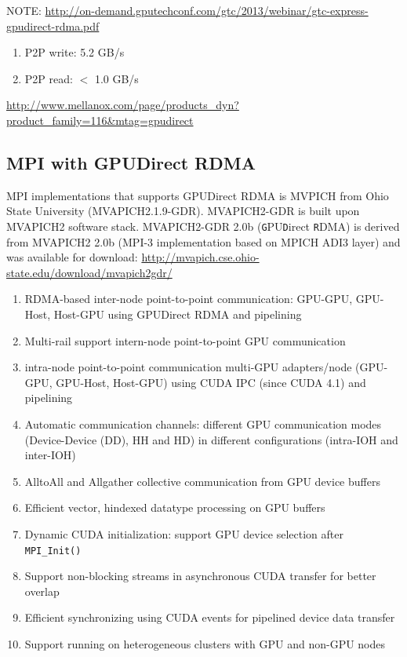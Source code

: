  
NOTE:
\url{http://on-demand.gputechconf.com/gtc/2013/webinar/gtc-express-gpudirect-rdma.pdf}
\begin{enumerate}
  \item P2P write: 5.2 GB/s
  \item P2P read: $<$ 1.0 GB/s
\end{enumerate}

\url{http://www.mellanox.com/page/products_dyn?product_family=116&mtag=gpudirect}

\subsection{MPI with GPUDirect RDMA}

MPI implementations that supports GPUDirect RDMA is MVPICH from Ohio State
University (MVAPICH2.1.9-GDR). MVAPICH2-GDR is built upon MVAPICH2 software
stack. MVAPICH2-GDR 2.0b  (\verb!G!PU\verb!D!irect \verb!R!DMA) is derived from
MVAPICH2 2.0b (MPI-3 implementation based on MPICH ADI3 layer) and was available for download:
\url{http://mvapich.cse.ohio-state.edu/download/mvapich2gdr/}

\begin{enumerate}
  \item RDMA-based inter-node point-to-point communication: GPU-GPU, GPU-Host,
  Host-GPU using GPUDirect RDMA and pipelining
  \item Multi-rail support intern-node point-to-point GPU communication
  \item intra-node point-to-point communication multi-GPU adapters/node
  (GPU-GPU, GPU-Host, Host-GPU) using CUDA IPC (since CUDA 4.1) and pipelining
  \item Automatic communication channels: different GPU communication modes
  (Device-Device (DD), HH and HD) in different configurations (intra-IOH and
  inter-IOH)
  
  \item AlltoAll and Allgather collective communication from GPU device buffers
  
  \item Efficient vector, hindexed datatype processing on GPU buffers
  
  \item Dynamic CUDA initialization: support GPU device selection after
  \verb!MPI_Init()!
  \item Support non-blocking streams in asynchronous CUDA transfer for better
  overlap
  \item Efficient synchronizing using CUDA events for pipelined device data
  transfer
  \item Support running on heterogeneous clusters with GPU and non-GPU nodes
\end{enumerate}


